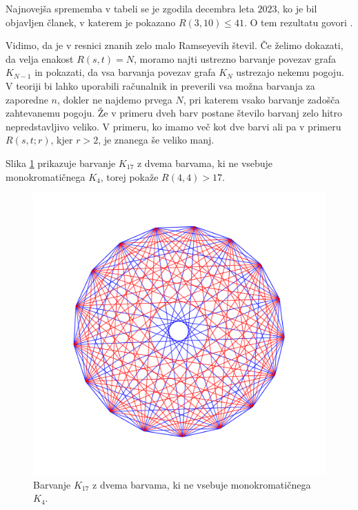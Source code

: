 \documentclass[twoside,11pt]{article}
\begin{document}
Najnovejša sprememba v tabeli se je zgodila decembra leta $2023$, ko je bil objavljen 
članek, v katerem je pokazano $R(3, 10) \le 41$. 
O tem rezultatu govori \cite{r41}.

Vidimo, da je v resnici znanih zelo malo Ramseyevih števil. Če želimo dokazati, 
da velja enakost $R(s, t) = N$, moramo najti ustrezno barvanje povezav grafa $K_{N-1}$ in pokazati, da 
vsa barvanja povezav grafa $K_{N}$ ustrezajo nekemu pogoju. V teoriji bi lahko uporabili računalnik 
in preverili vsa možna barvanja za zaporedne $n$, dokler ne najdemo prvega $N$, pri katerem vsako 
barvanje zadošča zahtevanemu pogoju. Že v primeru dveh barv postane število barvanj zelo hitro 
nepredstavljivo veliko. V primeru, ko imamo več kot dve barvi ali pa v primeru $R(s, t; r)$, kjer $r > 2$, je znanega še
veliko manj. 

\begin{zgled}
    Slika \ref{fig:r44} prikazuje barvanje $K_{17}$ z dvema barvama, ki ne vsebuje monokromatičnega $K_4$, torej 
    pokaže $R(4, 4) > 17$.
    \begin{figure}[h!]
        \centering
        \includegraphics[scale=0.125]{K17.png}
        \caption{Barvanje $K_{17}$ z dvema barvama, ki ne vsebuje monokromatičnega $K_4$.}
        \label{fig:r44}
    \end{figure}
\end{zgled}
\end{document}
